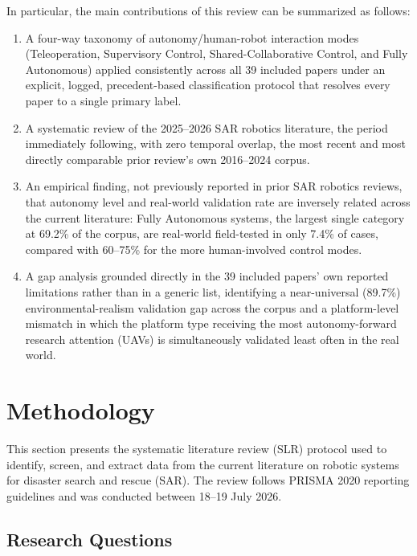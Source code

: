 \documentclass[journal]{IEEEtran}
\begin{document}
In particular, the main contributions of this review can be summarized as follows:
\begin{enumerate}
\item A four-way taxonomy of autonomy/human-robot interaction modes (Teleoperation, Supervisory Control, Shared-Collaborative Control, and Fully Autonomous) applied consistently across all 39 included papers under an explicit, logged, precedent-based classification protocol that resolves every paper to a single primary label.
\item A systematic review of the 2025--2026 SAR robotics literature, the period immediately following, with zero temporal overlap, the most recent and most directly comparable prior review's own 2016--2024 corpus.
\item An empirical finding, not previously reported in prior SAR robotics reviews, that autonomy level and real-world validation rate are inversely related across the current literature: Fully Autonomous systems, the largest single category at 69.2\% of the corpus, are real-world field-tested in only 7.4\% of cases, compared with 60--75\% for the more human-involved control modes.
\item A gap analysis grounded directly in the 39 included papers' own reported limitations rather than in a generic list, identifying a near-universal (89.7\%) environmental-realism validation gap across the corpus and a platform-level mismatch in which the platform type receiving the most autonomy-forward research attention (UAVs) is simultaneously validated least often in the real world.
\end{enumerate}

\section{Methodology}
\label{sec:methodology}
This section presents the systematic literature review (SLR) protocol used to identify, screen, and extract data from the current literature on robotic systems for disaster search and rescue (SAR). The review follows PRISMA 2020 reporting guidelines and was conducted between 18--19 July 2026.

\subsection{Research Questions}
\end{document}
